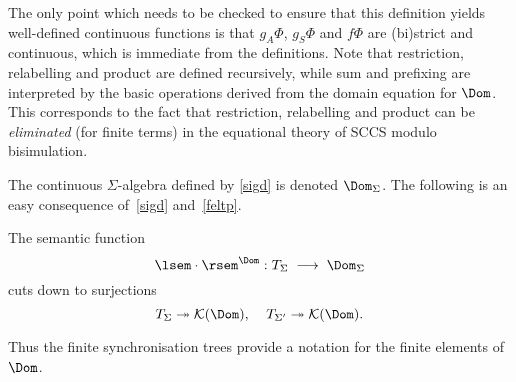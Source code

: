 The only point which needs to be checked to ensure that this definition yields well-defined continuous functions is that $g_{A} \Phi$, $g_{S} \Phi$ and $f \Phi$ are (bi)strict and continuous, which is immediate from the definitions.
Note that restriction, relabelling and product are defined recursively, while sum and prefixing are interpreted by the basic operations derived from the domain equation for $\Dom$.
This corresponds to the fact that restriction, relabelling and product can be {\em eliminated} (for finite terms) in the equational theory of SCCS modulo bisimulation.

The continuous $\Sigma$-algebra defined by \ref{sigd} is denoted $\Dom_{\Sigma}$.
The following is an easy consequence of~\ref{sigd} and~\ref{feltp}.

\begin{proposition}
\label{surs}
The semantic function
\[ \lsem\cdot \rsem^{\Dom} : T_{\Sigma} \; \longrightarrow \; \Dom_{\Sigma} \]
cuts down to surjections
\[ T_{\Sigma} \twoheadrightarrow {\cal K}(\Dom ), \;\;\;\; T_{\Sigma'} \twoheadrightarrow {\cal K}(\Dom ) . \]
\end{proposition}
Thus the finite synchronisation trees provide a notation for the finite elements of $\Dom$.

